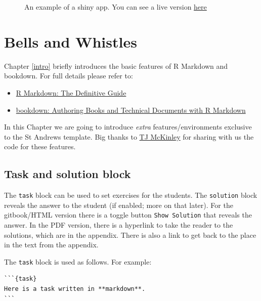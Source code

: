 \documentclass[
]{book}
\providecommand{\tightlist}{%
  \setlength{\itemsep}{0pt}\setlength{\parskip}{0pt}}
\theoremstyle{definition}
\theoremstyle{definition}
\theoremstyle{definition}
\theoremstyle{remark}
\begin{document}
\begin{figure}

\label{fig:myshiny}An example of a shiny app. You can see a live version \href{https://lindesaysh.shinyapps.io/faithfulshiny/}{here}

\end{figure}

\hypertarget{bellsandwhistles}{%
\chapter{Bells and Whistles}\label{bellsandwhistles}}

Chapter \ref{intro} briefly introduces the basic features of R Markdown and bookdown. For full details please refer to:

\begin{itemize}
\tightlist
\item
  \href{https://bookdown.org/yihui/rmarkdown/}{R Markdown: The Definitive Guide}
\item
  \href{https://bookdown.org/yihui/bookdown/}{bookdown: Authoring Books and Technical Documents with R Markdown}
\end{itemize}

In this Chapter we are going to introduce \emph{extra} features/environments exclusive to the St Andrews template. Big thanks to \href{https://github.com/tjmckinley/RtutorialSkeleton}{TJ McKinley} for sharing with us the code for these features.

\hypertarget{task-and-solution-block}{%
\section{Task and solution block}\label{task-and-solution-block}}

The \texttt{task} block can be used to set exercises for the students. The \texttt{solution} block reveals the answer to the student (if enabled; more on that later). For the gitbook/HTML version
there is a toggle button \texttt{Show\ Solution} that reveals the answer. In the PDF version, there is a hyperlink to take the reader to the solutions, which are in the appendix. There is also a link to get back to the place in the text from the appendix.

The \texttt{task} block is used as follows. For example:

\begin{verbatim}
```{task}
Here is a task written in **markdown**.
```
\end{verbatim}
\end{document}
